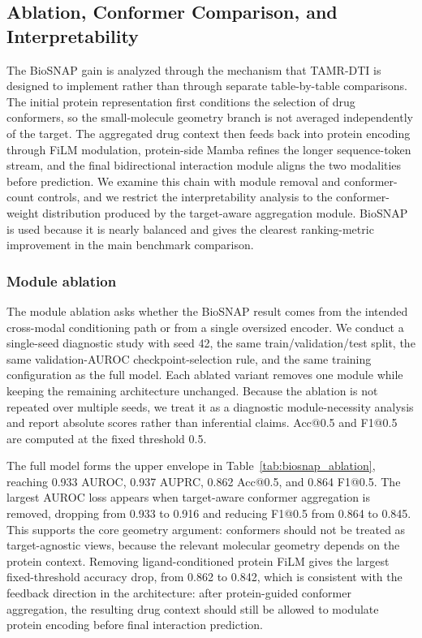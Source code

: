 \FloatBarrier
\subsection{Ablation, Conformer Comparison, and Interpretability}

The BioSNAP gain is analyzed through the mechanism that TAMR-DTI is designed to implement rather than through separate table-by-table comparisons. The initial protein representation first conditions the selection of drug conformers, so the small-molecule geometry branch is not averaged independently of the target. The aggregated drug context then feeds back into protein encoding through FiLM modulation, protein-side Mamba refines the longer sequence-token stream, and the final bidirectional interaction module aligns the two modalities before prediction. We examine this chain with module removal and conformer-count controls, and we restrict the interpretability analysis to the conformer-weight distribution produced by the target-aware aggregation module. BioSNAP is used because it is nearly balanced and gives the clearest ranking-metric improvement in the main benchmark comparison.

\subsubsection{Module ablation}

The module ablation asks whether the BioSNAP result comes from the intended cross-modal conditioning path or from a single oversized encoder. We conduct a single-seed diagnostic study with seed 42, the same train/validation/test split, the same validation-AUROC checkpoint-selection rule, and the same training configuration as the full model. Each ablated variant removes one module while keeping the remaining architecture unchanged. Because the ablation is not repeated over multiple seeds, we treat it as a diagnostic module-necessity analysis and report absolute scores rather than inferential claims. Acc@0.5 and F1@0.5 are computed at the fixed threshold 0.5.

The full model forms the upper envelope in Table~\ref{tab:biosnap_ablation}, reaching 0.933 AUROC, 0.937 AUPRC, 0.862 Acc@0.5, and 0.864 F1@0.5. The largest AUROC loss appears when target-aware conformer aggregation is removed, dropping from 0.933 to 0.916 and reducing F1@0.5 from 0.864 to 0.845. This supports the core geometry argument: conformers should not be treated as target-agnostic views, because the relevant molecular geometry depends on the protein context. Removing ligand-conditioned protein FiLM gives the largest fixed-threshold accuracy drop, from 0.862 to 0.842, which is consistent with the feedback direction in the architecture: after protein-guided conformer aggregation, the resulting drug context should still be allowed to modulate protein encoding before final interaction prediction.


